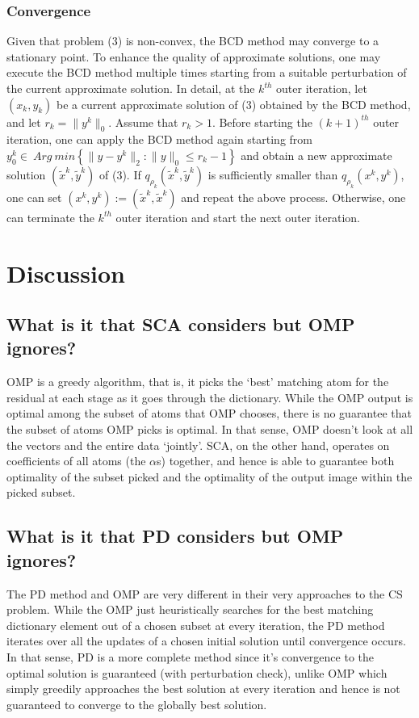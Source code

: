 \documentclass[letterpaper, 10 pt, conference]{article}
\begin{document}
\subsubsection{Convergence}

Given that problem (3) is non-convex, the BCD method may converge to a stationary point. To enhance the quality of approximate solutions, one may execute the BCD method
multiple times starting from a suitable perturbation of the current approximate solution. In detail, at the $k^{th}$ outer iteration, let $(x_k,y_k)$ be a current approximate solution of (3) obtained by the BCD
method, and let $r_k=\|y^k\|_0$. Assume that $r_k > 1$. Before starting the $(k + 1)^{th}$ outer iteration, one can apply the BCD method again starting from $y_0^k\in\ Arg\ min\left\lbrace{\|y-y^k\|_2:\|y\|_0\leq r_k -1}\right\rbrace$ and obtain a new approximate solution $({\tilde{x}}^k,{\tilde{y}}^k)$ of (3). If $q_{\rho_k}({\tilde{x}}^k,{\tilde{y}}^k)$ is sufficiently smaller than $q_{\rho_k}(x^k,y^k)$, one can set $(x^k,y^k):=({\tilde{x}}^k,{\tilde{x}}^k)$ and repeat the above process. Otherwise, one can terminate the $k^{th}$ outer iteration and start the next outer iteration.

\section{Discussion}
\subsection{What is it that SCA considers but OMP ignores?}
OMP is a greedy algorithm, that is, it picks the `best' matching atom for the residual at each stage as it goes through the dictionary. While the OMP output is optimal among the subset of atoms that OMP chooses, there is no guarantee that the subset of atoms OMP picks is optimal. In that sense, OMP doesn't look at all the vectors and the entire data `jointly'. SCA, on the other hand, operates on coefficients of all atoms (the $\alpha$s) together, and hence is able to guarantee both optimality of the subset picked and the optimality of the output image within the picked subset.

\subsection{What is it that PD considers but OMP ignores?}
The PD method and OMP are very different in their very approaches to the CS problem. While the OMP just heuristically searches for the best matching dictionary element out of a chosen subset at every iteration, the PD method iterates over all the updates of a chosen initial solution until convergence occurs. In that sense, PD is a more complete method since it's convergence to the optimal solution is guaranteed (with perturbation check), unlike OMP which simply greedily approaches the best solution at every iteration and hence is not guaranteed to converge to the globally best solution. 
\end{document}
